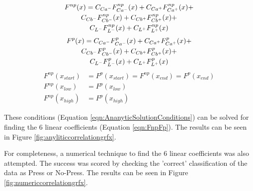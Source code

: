 \newlength{\savedbelowdisplayskip}
\newlength{\savedabovedisplayskip}
\newlength{\savedbelowdisplayshortskip}
\newlength{\savedabovedisplayshortskip}

\setlength{\savedbelowdisplayskip}{\belowdisplayskip} \setlength{\savedbelowdisplayshortskip}{\belowdisplayshortskip}
\setlength{\savedabovedisplayskip}{\abovedisplayskip} \setlength{\savedabovedisplayshortskip}{\abovedisplayshortskip}

\setlength{\belowdisplayskip}{0pt} \setlength{\belowdisplayshortskip}{0pt}
\setlength{\abovedisplayskip}{0pt} \setlength{\abovedisplayshortskip}{0pt}


\begin{multline*}
F^{np}(x) =    C_{Ca^-} F^{np}_{Ca^-}(x) + C_{Ca^+} F^{np}_{Ca^+}(x) +   \\
  C_{Cb^-} F^{np}_{Cb^-}(x) + C_{Cb^+} F^{np}_{Cb^+}(x) +   \\ 
  C_{L^-}    F^{np}_{  L^-}(x) + C_{L^+}   F^{np}_{   L^+}(x)   
\end{multline*} 
\begin{multline}
F^{p}(x) =  
 C_{Ca^-} F^{p}_{Ca^-}(x) + C_{Ca^+} F^{p}_{Ca^+}(x) +  \\
  C_{Cb^-} F^{p}_{Cb^-}(x) + C_{Cb^+} F^{p}_{Cb^+}(x) + \\ 
   C_{L^-}    F^{p}_{  L^-}(x) + C_{L^+}   F^{p}_{   L^+}(x) 
\end{multline}\label{eqn:FnpFp}
\begin{align}
F^{np}(x_{start}) & = F^{p}(x_{start}) = F^{np}(x_{end}) = F^{p}(x_{end}) \nonumber  \\
F^{np}(x_{low}) & = F^{p}(x_{low})  \nonumber  \\
F^{np}(x_{high}) & = F^{p}(x_{high})  \label{eqn:AnanyticSolutionConditions}
\end{align}


\setlength{\belowdisplayskip}{\savedbelowdisplayskip} \setlength{\belowdisplayshortskip}{\savedbelowdisplayshortskip}
\setlength{\abovedisplayskip}{\savedabovedisplayskip} \setlength{\abovedisplayshortskip}{\savedabovedisplayshortskip}

These conditions (Equation \ref{eqn:AnanyticSolutionConditions}) can be solved for finding the 6 linear coefficients (Equation \ref{eqn:FnpFp}). The results can be seen in Figure \ref{fig:anyliticcorrelationgrfx}.

For completeness, a numerical technique to find the 6 linear coefficients was also attempted. The success was scored by checking the 'correct' classification of the data as Press or No-Press. The results can be seen in Figure \ref{fig:numericcorrelationgrfx}. 

